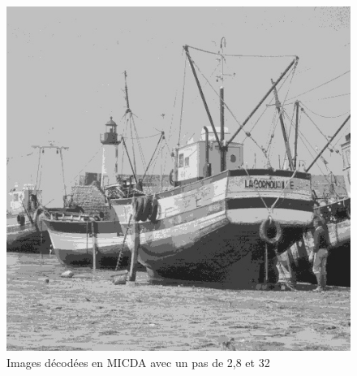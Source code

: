 \documentclass[12pt]{report}
\begin{document}
\begin{figure}[H]
\begin{center}
\includegraphics[scale=0.25]{../ImageRes/ImagedecodeeMICDAQ32.jpg} 
\caption{Images décodées en MICDA avec un pas de 2,8 et 32 }
\end{center}
\end{figure}
\end{document}

